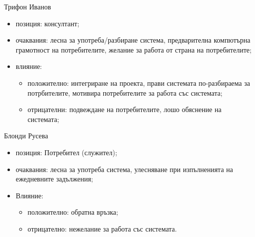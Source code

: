 \documentclass{beamer}
\begin{document}
\begin{frame}
    \begin{block}{Трифон Иванов}
        \begin{itemize}
            \item позиция: консултант;
            \item очаквания: лесна за употреба/разбиране система,
                предварителна компютърна грамотност на потребителите,
                желание за работа от страна на потребителите;
            \item влияние:
                \begin{itemize}
                    \item положително: интегриране на проекта, прави
                        системата по-разбираема за потрбителите, мотивира
                        потребителите за работа със системата;
                    \item отрицателни: подвеждане на потребителите, лошо обяснение на системата;
                \end{itemize}
        \end{itemize}
    \end{block}
\end{frame}

\begin{frame}
    \begin{block}{Блонди Русева}
        \begin{itemize}
            \item позиция: Потребител (служител);
            \item очаквания: лесна за употреба система, улесняване при
            изпълненията на ежедневните задължения;
            \item Влияние:
            \begin{itemize}
                \item положително: обратна връзка;
                \item отрицателно: нежелание за работа със системата.
            \end{itemize}
        \end{itemize}
    \end{block}
\end{frame}
\end{document}

